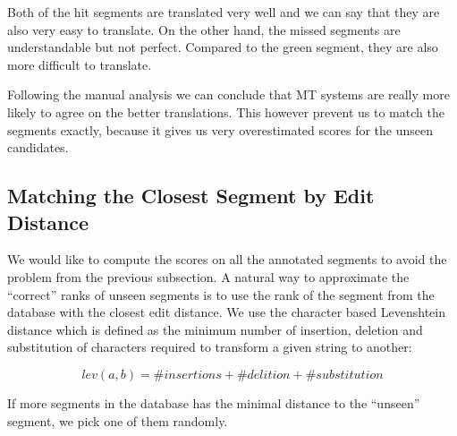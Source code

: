 \noindent Both of the hit segments are translated very well and we can say that
they are also very easy to translate. On the other hand, the missed segments
are understandable but not perfect. Compared to the green segment, they are
also more difficult to translate.

Following the manual analysis we can conclude that MT systems are really more
likely to agree on the better translations. This however prevent us to match
the segments exactly, because it gives us very overestimated scores for the
unseen candidates.

\subsection{Matching the Closest Segment by Edit Distance}
\label{match:editdistance}

We would like to compute the scores on all the annotated segments to avoid the
problem from the previous subsection. A natural way to approximate the
``correct'' ranks of unseen segments is to use the rank of the segment from the
database with the closest edit distance. We use the character based Levenshtein
distance which is defined as the minimum number of insertion, deletion and
substitution of characters required to transform a given string to another:

\begin{equation*}
  lev(a,b) = \#insertions + \#delition + \#substitution
\end{equation*}

\noindent If more segments in the database has the minimal distance to the ``unseen'' 
segment, we pick one of them randomly.


